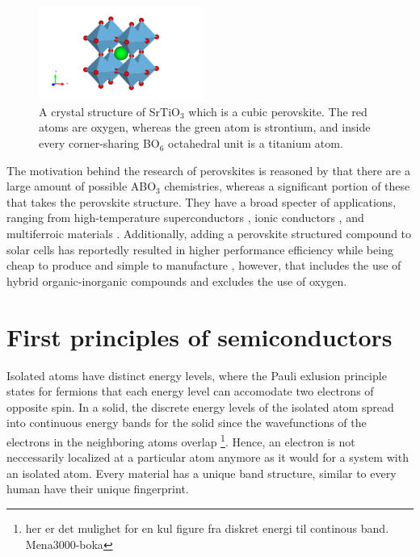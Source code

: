 \begin{figure}
  \centering
  \includegraphics[width=0.48\textwidth]{theory/figures/SrTiO3_mp-5229_primitive.pdf}
  \caption{A crystal structure of SrTiO$_3$ which is a cubic perovskite. The red atoms are oxygen, whereas the green atom is strontium, and inside every corner-sharing BO$_6$ octahedral unit is a titanium atom.}
  \label{fig:pic}
\end{figure}

The motivation behind the research of perovskites is reasoned by that there are a large amount of possible ABO$_3$ chemistries, whereas a significant portion of these that takes the perovskite structure. They have a broad specter of applications, ranging from high-temperature superconductors \cite{Bednorz1988}, ionic conductors \cite{Boivin1998}, and  multiferroic materials \cite{Cheong2007}. Additionally, adding a perovskite structured compound to solar cells has reportedly resulted in higher performance efficiency while being cheap to produce and simple to manufacture \cite{IbnMohammed2017, Chen2014}, however, that includes the use of hybrid organic-inorganic compounds and excludes the use of oxygen.

\section{First principles of semiconductors}

Isolated atoms have distinct energy levels, where the Pauli exlusion principle \cite{Pauli1925} states for fermions that each energy level can accomodate two electrons of opposite spin. In a solid, the discrete energy levels of the isolated atom spread into continuous energy bands for the solid since the wavefunctions of the electrons in the neighboring atoms overlap \footnote{her er det mulighet for en kul figure fra diskret energi til continous band. Mena3000-boka}. Hence, an electron is not neccessarily localized at a particular atom anymore as it would for a system with an isolated atom. Every material has a unique band structure, similar to every human have their unique fingerprint.

